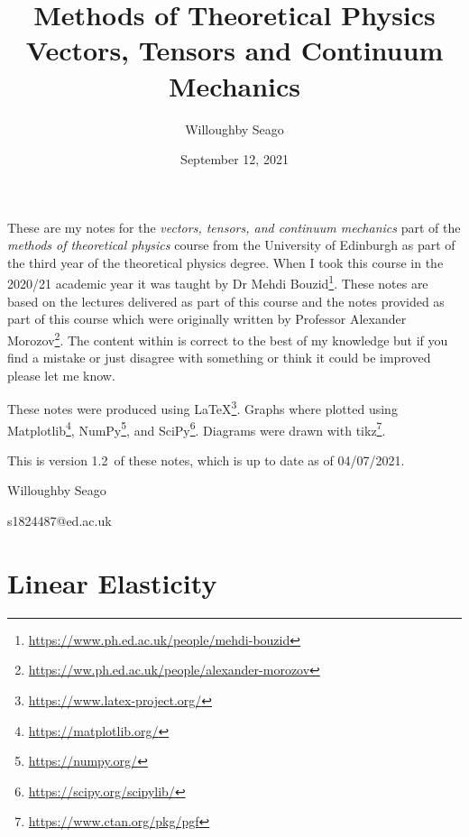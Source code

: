 \documentclass[a4paper]{article}
\author{Willoughby Seago}
\date{September 12, 2021}
\title{
    Methods of Theoretical Physics\\
    {\Large Vectors, Tensors and Continuum Mechanics}
}
\newcommand{\notesVersion}{1.2}
\newcommand{\notesDate}{04/07/2021}
\begin{document}
    \maketitle
    These are my notes for the \textit{vectors, tensors, and continuum mechanics} part of the \textit{methods of theoretical physics} course from the University of Edinburgh as part of the third year of the theoretical physics degree.
    When I took this course in the 2020/21 academic year it was taught by Dr Mehdi Bouzid\footnote{\url{https://www.ph.ed.ac.uk/people/mehdi-bouzid}}.
    These notes are based on the lectures delivered as part of this course and the notes provided as part of this course which were originally written by Professor Alexander Morozov\footnote{\url{https://ww.ph.ed.ac.uk/people/alexander-morozov}}.
    The content within is correct to the best of my knowledge but if you find a mistake or just disagree with something or think it could be improved please let me know.
    
    These notes were produced using \LaTeX\footnote{\url{https://www.latex-project.org/}}.
    Graphs where plotted using Matplotlib\footnote{\url{https://matplotlib.org/}}, NumPy\footnote{\url{https://numpy.org/}}, and SciPy\footnote{\url{https://scipy.org/scipylib/}}.
    Diagrams were drawn with tikz\footnote{\url{https://www.ctan.org/pkg/pgf}}.
    
    This is version \notesVersion~of these notes, which is up to date as of \notesDate.
    \begin{flushright}
        Willoughby Seago
        
        s1824487@ed.ac.uk
    \end{flushright}
    \clearpage
    \tableofcontents
    \listoffigures
    \printglossary[type=\acronymtype, title=Acronyms]
    \clearpage
    \begingroup
    \let\clearpage\relax  %
    
    \endgroup
    
    
    \part{Linear Elasticity}
\end{document}
